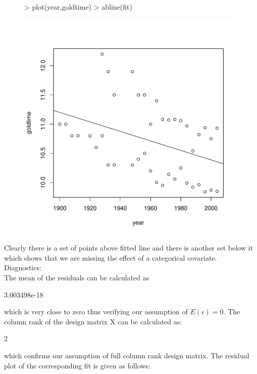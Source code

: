 \documentclass[12pt]{article}
\begin{document}
\begin{figure}[H]
\begin{Schunk}
\begin{Sinput}
> plot(year,goldtime)
> abline(fit)
\end{Sinput}
\end{Schunk}
\includegraphics{HW4-008}
\end{figure}
Clearly there is a set of points above fitted line and there is another set below it which shows that we are missing the effect of a categorical covariate.\\
Diagnostics:\\
The mean of the residuals can be calculated as 
\begin{Schunk}
\begin{Soutput}
[1] 3.003498e-18
\end{Soutput}
\end{Schunk}
which is very close to zero thus verifying our assumption of $E(\epsilon)=0$. The column rank of the design matrix X can be calculated as:
\begin{Schunk}
\begin{Soutput}
[1] 2
\end{Soutput}
\end{Schunk}
which confirms our assumption of full column rank design matrix.
\clearpage
The residual plot of the corresponding fit is given as follows:
\end{document}

